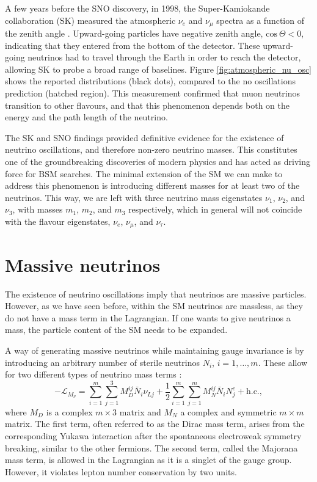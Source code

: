 A few years before the SNO discovery, in 1998, the Super-Kamiokande collaboration (SK) measured the atmospheric $\nu_{e}$ and $\nu_{\mu}$ spectra as a function of the zenith angle \cite{SuperKamiokande1998}. Upward-going particles have negative zenith angle, $\mathrm{cos}~\Theta < 0$, indicating that they entered from the bottom of the detector. These upward-going neutrinos had to travel through the Earth in order to reach the detector, allowing SK to probe a broad range of baselines. Figure \ref{fig:atmospheric_nu_osc} shows the reported distributions (black dots), compared to the no oscillations prediction (hatched region). This measurement confirmed that muon neutrinos transition to other flavours, and that this phenomenon depends both on the energy and the path length of the neutrino.

The SK and SNO findings provided definitive evidence for the existence of neutrino oscillations, and therefore non-zero neutrino masses. This constitutes one of the groundbreaking discoveries of modern physics and has acted as driving force for BSM searches. The minimal extension of the SM we can make to address this phenomenon is introducing different masses for at least two of the neutrinos. This way, we are left with three neutrino mass eigenstates $\nu_{1}$, $\nu_{2}$, and $\nu_{3}$, with masses $m_{1}$, $m_{2}$, and $m_{3}$ respectively, which in general will not coincide with the flavour eigenstates, $\nu_{e}$, $\nu_{\mu}$, and $\nu_{\tau}$.

\section{Massive neutrinos}\label{sec:nu_mass}

The existence of neutrino oscillations imply that neutrinos are massive particles. However, as we have seen before, within the SM neutrinos are massless, as they do not have a mass term in the Lagrangian. If one wants to give neutrinos a mass, the particle content of the SM needs to be expanded.

A way of generating massive neutrinos while maintaining gauge invariance is by introducing an arbitrary number of sterile neutrinos $N_{i}$, $i=1,\dots,m$. These allow for two different types of neutrino mass terms \cite{Gonzalez-Garcia2007}:
\begin{equation}\label{eq:nu_mass_lagrangian}
	-\mathcal{L}_{M_{\nu}} = \sum_{i=1}^{m} \sum_{j=1}^{3} M^{ij}_{D} \bar{N}_{i} \nu_{Lj} + \frac{1}{2} \sum_{i=1}^{m} \sum_{j=1}^{m} M^{ij}_{N} \bar{N}_{i} N^{c}_{j} + \mathrm{h.c.},
\end{equation}
where $M_{D}$ is a complex $m \times 3$ matrix and $M_{N}$ a complex and symmetric $m \times m$ matrix. The first term, often referred to as the Dirac mass term, arises from the corresponding Yukawa interaction after the spontaneous electroweak symmetry breaking, similar to the other fermions. The second term, called the Majorana mass term, is allowed in the Lagrangian as it is a singlet of the gauge group. However, it violates lepton number conservation by two units.

